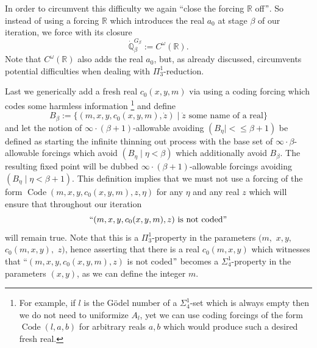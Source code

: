 \documentclass[a4paper,11pt]{article}
\newcommand{\forceQ}{\mathbb{Q}}
\newcommand{\forceR}{\mathbb{R}}
\begin{document}
In order to circumvent this difficulty we  again ``close the forcing $\forceR$ off$"$. So instead of using a forcing $\forceR$ which introduces the real $a_0$ at stage $\beta$ of our iteration, we force with its closure \[ \dot{\forceQ}_{\beta}^{G_{\beta}} := C^{\omega} (\forceR). \] Note that $C^{\omega} (\forceR)$ also adds the real $a_0$, but, as already discussed, circumvents potential difficulties when dealing with $\Pi^1_3$-reduction.







 Last we generically add a fresh real $c_0 (x,y,m)$ via using a coding forcing which codes some harmless information \footnote{For example, if $l$ is the G\"odel number of a $\Sigma^1_4$-set which is always empty then we do not need to uniformize $A_l$, yet we can use coding forcings of the form $\operatorname{Code} (l,a,b) $ for arbitrary reals $a,b$ which would produce such a desired fresh real. } and define
\[ B_{\beta} :=  \{ (m,x,y,c_0 (x,y,m),\dot{z}) \mid \dot{z} \text{ some name of a real}  \} \]
and let the notion of $\infty \cdot (\beta+1)$-allowable avoiding $(B_{\eta} \mid < \le \beta+1)$ be defined as starting the infinite thinning out process with the base set of $\infty \cdot \beta$-allowable forcings which avoid $(B_{\eta} \mid \eta < \beta) $ which additionally avoid $B_{\beta}$. The resulting fixed point will be dubbed $\infty \cdot (\beta+1)$-allowable forcings avoiding $(B_{\eta} \mid \eta < \beta+1)$.
This definition implies that we must not use a forcing of the form $\operatorname{Code} (m,x,y,c_0 (x,y,m), z, \eta)$ for any $\eta$ and any real $z$ which will ensure that throughout our iteration \[``(m,x,y,c_0(x,y,m), z) \text{ is not coded$"$} \] will remain true. Note that this is a $\Pi^1_3$-property in the parameters $(m,$ $x,y,$ $c_0(m,x,y),$ $z)$, hence asserting that there is a  real $c_0 (m,x,y)$ which witnesses that ``$(m,x,y,c_0(x,y,m), z)$ is not coded$"$ becomes a $\Sigma^1_4$-property in the parameters $(x,y)$, as we can define the integer $m$. 
\end{document}
